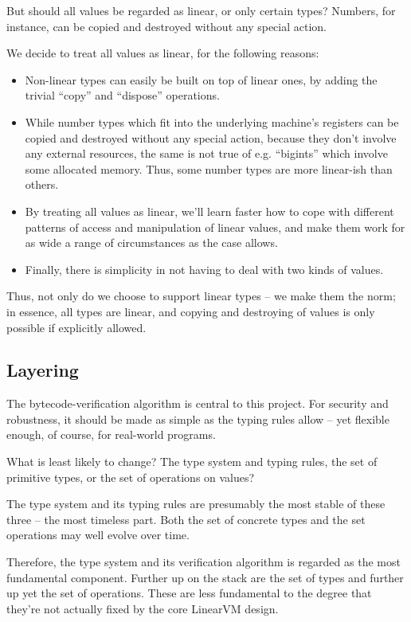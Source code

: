 \documentclass[a4paper]{book}
\begin{document}
But should all values be regarded as linear, or only certain types? Numbers,
for instance, can be copied and destroyed without any special action.

We decide to treat all values as linear, for the following reasons:
\begin{itemize}
\item Non-linear types can easily be built on top of linear ones, by adding
  the trivial ``copy'' and ``dispose'' operations.
\item While number types which fit into the underlying machine's registers
  can be copied and destroyed without any special action, because they
  don't involve any external resources, the same is not true of
  e.g. ``bigints'' which involve some allocated memory.
  Thus, some number types are more linear-ish than others.
\item By treating all values as linear, we'll learn faster how to cope with
  different patterns of access and manipulation of linear values, and
  make them work for as wide a range of circumstances as the case allows.
\item Finally, there is simplicity in not having to deal with two
  kinds of values.
\end{itemize}

Thus, not only do we choose to support linear types -- we make them the
norm; in essence, all types are linear, and copying and destroying of values
is only possible if explicitly allowed.

\subsection{Layering}
The bytecode-verification algorithm is central to this project.
For security and robustness, it should be made as simple as the
typing rules allow -- yet flexible enough, of course, for real-world
programs.

What is least likely to change? The type system and typing rules, the
set of primitive types, or the set of operations on values?

The type system and its typing rules are presumably the most stable of
these three -- the most timeless part. Both the set of concrete types
and the set operations may well evolve over time.

Therefore, the type system and its verification algorithm is regarded
as the most fundamental component. Further up on the stack are the set
of types and further up yet the set of operations. These are less
fundamental to the degree that they're not actually fixed by the core
LinearVM design.
\end{document}
